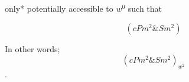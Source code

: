 \documentclass[phdthesis,12pt,final]{wuthesis}
\theoremstyle{definition}
\theoremstyle{definition}
\theoremstyle{definition}
\theoremstyle{definition}
\theoremstyle{remark}
\begin{document}

\noindent *only* potentially accessible to \(w^{0}\) such that

\[( cPm^{2} \& Sm^{2} )\]

\noindent In other words; \[( cPm^{2} \& Sm^{2} )_{w^{2}}\].
\end{document}
